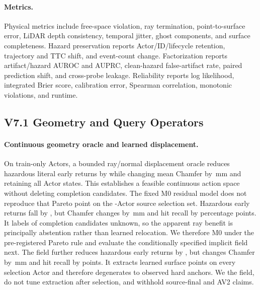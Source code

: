 \paragraph{Metrics.}
Physical metrics include free-space violation, ray termination, point-to-surface error, LiDAR depth consistency, temporal jitter, ghost components, and surface completeness. Hazard preservation reports Actor/ID/lifecycle retention, trajectory and TTC shift, and event-count change. Factorization reports artifact/hazard AUROC and AUPRC, clean-hazard false-artifact rate, paired prediction shift, and cross-probe leakage. Reliability reports log likelihood, integrated Brier score, calibration error, Spearman correlation, monotonic violations, and runtime.

\subsection{V7.1 Geometry and Query Operators}

\paragraph{Continuous geometry oracle and learned displacement.}
On train-only Actors, a bounded ray/normal displacement oracle reduces hazardous literal early returns by
\VSevenOneSOneHazardEarlyReduction{} while changing mean Chamfer by \VSevenOneSOneChamferDeltaMm{}\,mm and retaining all
Actor states. This establishes a feasible continuous action space without deleting completion candidates. The fixed M0 residual
model does not reproduce that Pareto point on the \VSevenOneMZeroSelectionActors{}-Actor source selection set. Hazardous early
returns fall by \VSevenOneMZeroHazardEarlyReduction{}, but Chamfer changes by \VSevenOneMZeroChamferDeltaMm{}\,mm and hit
recall by \VSevenOneMZeroHitRecallDeltaPp{} percentage points. It labels \VSevenOneMZeroUnknownFraction{} of completion
candidates unknown, so the apparent ray benefit is principally abstention rather than learned relocation. We therefore
\VSevenOneMZeroVerdict{} M0 under the pre-registered Pareto rule and evaluate the conditionally specified implicit field next.
The field further reduces hazardous early returns by \VSevenOneMOneHazardEarlyReduction{}, but changes Chamfer by
\VSevenOneMOneChamferDeltaMm{}\,mm and hit recall by \VSevenOneMOneHitRecallDeltaPp{} points. It extracts
\VSevenOneMOneFieldPoints{} learned surface points on every selection Actor and therefore degenerates to observed hard anchors.
We \VSevenOneMOneVerdict{} the field, do not tune extraction after selection, and withhold source-final and AV2 claims.


